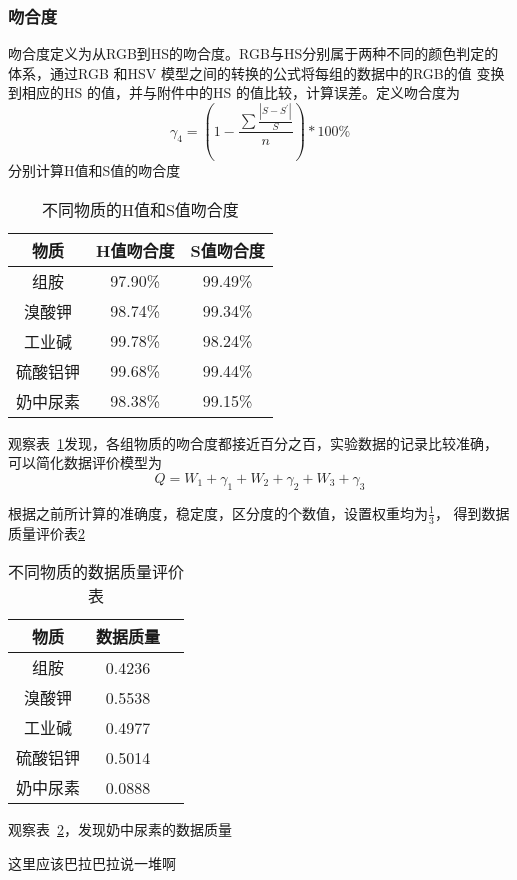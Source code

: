     \subsubsection{吻合度}
    吻合度定义为从RGB到HS的吻合度。RGB与HS分别属于两种不同的颜色判定的体系，通过RGB 和HSV 模型之间的转换的公式将每组的数据中的RGB的值
    变换到相应的HS 的值，并与附件中的HS 的值比较，计算误差。定义吻合度为
    $$\gamma_4=(1-\frac{\sum\frac{|S-S^{'}|}{S}}{n})*100\%$$
    分别计算H值和S值的吻合度
    \begin{table}[H]
      \centering
      \caption{不同物质的H值和S值吻合度}
      \label{吻合度表}
      \begin{tabular}{@{}ccc@{}}
      \toprule
      物质 & H值吻合度  & S值吻合度   \\ \midrule
      组胺 & 97.90\% & 99.49\% \\
      溴酸钾 & 98.74\% & 99.34\% \\
      工业碱 & 99.78\% & 98.24\% \\
      硫酸铝钾 & 99.68\% & 99.44\% \\
      奶中尿素 & 98.38\% & 99.15\% \\ \bottomrule
      \end{tabular}
    \end{table}
    
    观察表~\ref{吻合度表}发现，各组物质的吻合度都接近百分之百，实验数据的记录比较准确，
    可以简化数据评价模型为
    $$Q=W_1+\gamma_1+W_2+\gamma_2+W_3+\gamma_3$$
    
    根据之前所计算的准确度，稳定度，区分度的个数值，设置权重均为$\frac{1}{3}$， 得到数据质量评价表\ref{数据质量表}
    
    \begin{table}[H]
      \centering
      \caption{不同物质的数据质量评价表}
      \label{数据质量表}
      \begin{tabular}{@{}ccc@{}}
      \toprule
      物质 & 数据质量  \\ \midrule
      组胺 & 0.4236  \\
      溴酸钾 & 0.5538  \\
      工业碱 & 0.4977  \\
      硫酸铝钾 & 0.5014 \\
      奶中尿素 & 0.0888 \\ \bottomrule
      \end{tabular}
    \end{table}
    
    
    观察表~\ref{数据质量表}，发现奶中尿素的数据质量
    
    
    这里应该巴拉巴拉说一堆啊
    